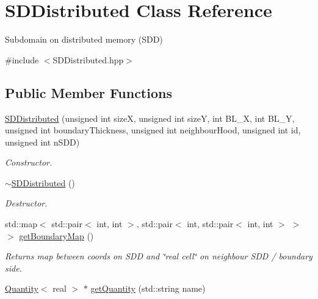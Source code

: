 \hypertarget{classSDDistributed}{}\section{S\+D\+Distributed Class Reference}
\label{classSDDistributed}


Subdomain on distributed memory (S\+DD)  




{\ttfamily \#include $<$S\+D\+Distributed.\+hpp$>$}

\subsection*{Public Member Functions}
\begin{DoxyCompactItemize}
\item 
\mbox{\hyperlink{classSDDistributed_a07332d418da104a969360c6c671feef4}{S\+D\+Distributed}} (unsigned int sizeX, unsigned int sizeY, int B\+L\+\_\+X, int B\+L\+\_\+Y, unsigned int boundary\+Thickness, unsigned int neighbour\+Hood, unsigned int id, unsigned int n\+S\+DD)
\begin{DoxyCompactList}\small\item\em Constructor. \end{DoxyCompactList}\item 
\mbox{\label{classSDDistributed_a1af9779279416a7bd519747e3b029124}} 
\mbox{\hyperlink{classSDDistributed_a1af9779279416a7bd519747e3b029124}{$\sim$\+S\+D\+Distributed}} ()
\begin{DoxyCompactList}\small\item\em Destructor. \end{DoxyCompactList}\item 
\mbox{\label{classSDDistributed_a3617b83f6f2a6368b1f17c938d921e0a}} 
std\+::map$<$ std\+::pair$<$ int, int $>$, std\+::pair$<$ int, std\+::pair$<$ int, int $>$ $>$ $>$ \mbox{\hyperlink{classSDDistributed_a3617b83f6f2a6368b1f17c938d921e0a}{get\+Boundary\+Map}} ()
\begin{DoxyCompactList}\small\item\em Returns map between coords on S\+DD and \char`\"{}real cell\char`\"{} on neighbour S\+DD / boundary side. \end{DoxyCompactList}\item 
\mbox{\hyperlink{classQuantity}{Quantity}}$<$ real $>$ $\ast$ \mbox{\hyperlink{classSDDistributed_a14f296606ff1afa1e4878fa6c4928afc}{get\+Quantity}} (std\+::string name)

\end{DoxyCompactItemize}
